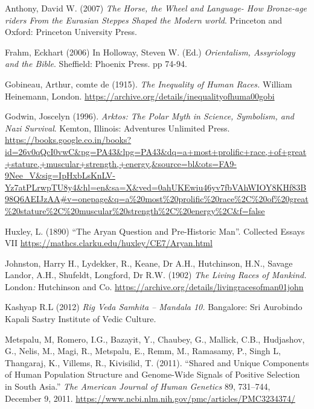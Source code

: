 \begin{thebibliography}{99}
 Anthony, David W. (2007) \textit{The Horse, the Wheel and Language- How Bronze-age riders From the Eurasian Steppes Shaped the Modern world}. Princeton and Oxford: Princeton University Press.

  Frahm, Eckhart (2006) In Holloway, Steven W. (Ed.) \textit{Orientalism, Assyriology and the Bible}. Sheffield: Phoenix Press. pp 74-94.

  Gobineau, Arthur, comte de (1915). \textit{The Inequality of Human Races. }William Heinemann, London. \url{https://archive.org/details/inequalityofhuma00gobi}

  Godwin, Joscelyn (1996). \textit{Arktos: The Polar Myth in Science, Symbolism, and Nazi Survival}. Kemton, Illinois: Adventures Unlimited Press. \url{https://books.google.co.in/books?id=26v0qQcI0vwC&pg=PA43&lpg=PA43&dq=a+most+prolific+race,+of+great+stature,+muscular+strength,+energy,&source=bl&ots=FA9-9Nee_V&sig=IpHxbLsKnLV-Yz7atPLrwpTU8y4&hl=en&sa=X&ved=0ahUKEwiu46yv7fbVAhWIOY8KHf83B98Q6AEIJzAA#v=onepage&q=a%20most%20prolific%20race%2C%20of%20great%20stature%2C%20muscular%20strength%2C%20energy%2C&f=false}

  Huxley, L. (1890) “The Aryan Question and Pre-Historic Man”. Collected Essays VII \url{https://mathcs.clarku.edu/huxley/CE7/Aryan.html}

  Johnston, Harry H., Lydekker, R., Keane, Dr A.H., Hutchinson, H.N., Savage Landor, A.H., Shufeldt, Longford, Dr R.W. (1902) \textit{The Living Races of Mankind. }London\textit{:} Hutchinson and Co. \url{ https://archive.org/details/livingracesofman01john}

  Kashyap R.L (2012) \textit{Rig Veda Samhita – Mandala 10. }Bangalore: Sri Aurobindo Kapali Sastry Institute of Vedic Culture.

  Metspalu, M, Romero, I.G., Bazayit, Y., Chaubey, G., Mallick, C.B., Hudjashov, G., Nelis, M., Magi, R., Metspalu, E., Remm, M., Ramasamy, P., Singh L, Thangaraj, K., Villems, R., Kivisilid, T. (2011). “Shared and Unique Components of Human Population Structure and Genome-Wide Signals of Positive Selection in South Asia.” \textit{The American Journal of Human Genetics} 89, 731–744, December 9, 2011. \url{https://www.ncbi.nlm.nih.gov/pmc/articles/PMC3234374/}


\end{thebibliography}
